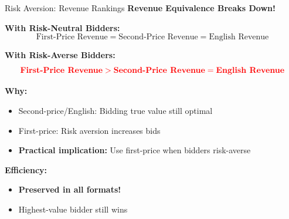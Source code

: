 \documentclass[xcolor={x11names}, aspectratio=169 ]{beamer}
\begin{document}
\begin{frame}{Risk Aversion: Revenue Rankings}
\textbf{Revenue Equivalence Breaks Down!}

\textbf{With Risk-Neutral Bidders:}
$$\text{First-Price Revenue} = \text{Second-Price Revenue} = \text{English Revenue}$$

\textbf{With Risk-Averse Bidders:}
$$\textcolor{red}{\textbf{First-Price Revenue} > \textbf{Second-Price Revenue} = \textbf{English Revenue}}$$

\textbf{Why:}
\begin{itemize}
  \item Second-price/English: Bidding true value still optimal
  \item First-price: Risk aversion increases bids
  \item \textbf{Practical implication:} Use first-price when bidders risk-averse
\end{itemize}

\textbf{Efficiency:}
\begin{itemize}
  \item \textcolor{green!70!black}{\textbf{Preserved in all formats!}}
  \item Highest-value bidder still wins
\end{itemize}
\end{frame}
\end{document}

